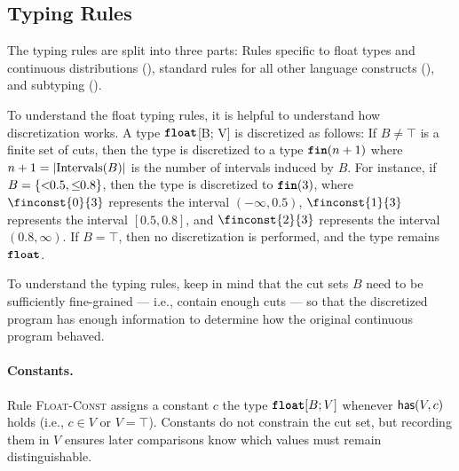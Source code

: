 \subsection{Typing Rules}\label{sec:type-system}
The typing rules are split into three parts: Rules specific to float types and continuous distributions (), standard rules for all other language constructs (), and subtyping ().

To understand the float typing rules, it is helpful to understand how discretization works.
A type $\textnormal{\ttfamily\bfseries float}$[B; V] is discretized as follows:
    If $B \neq\top$ is a finite set of cuts, then the type is discretized to a type $\textnormal{\ttfamily\bfseries fin}(n+1)$ where $n+1 = |\text{Intervals}(B)|$ is the number of intervals induced by $B$. For instance, if $B = \{<\!\!{0.5}, \leq\!\!{0.8}\}$, then the type is discretized to $\textnormal{\ttfamily\bfseries fin}(3)$, where $\finconst{0}{3}$ represents the interval $(-\infty, 0.5)$, $\finconst{1}{3}$ represents the interval $[0.5, 0.8]$, and $\finconst{2}{3}$ represents the interval $(0.8, \infty)$.
    If $B = \top$, then no discretization is performed, and the type remains $\textnormal{\ttfamily\bfseries float}$.

To understand the typing rules, keep in mind that the cut sets $B$ need to be sufficiently fine-grained --- i.e., contain enough cuts --- so that the discretized program has enough information to determine how the original continuous program behaved.



\paragraph{Constants.}
Rule \textsc{Float-Const} assigns a constant $c$ the type $\textnormal{\ttfamily\bfseries float}[B; V]$ whenever $\mathsf{has}(V, c)$ holds (i.e., $c\in V$ or $V=\top$). Constants do not constrain the cut set, but recording them in $V$ ensures later comparisons know which values must remain distinguishable.

